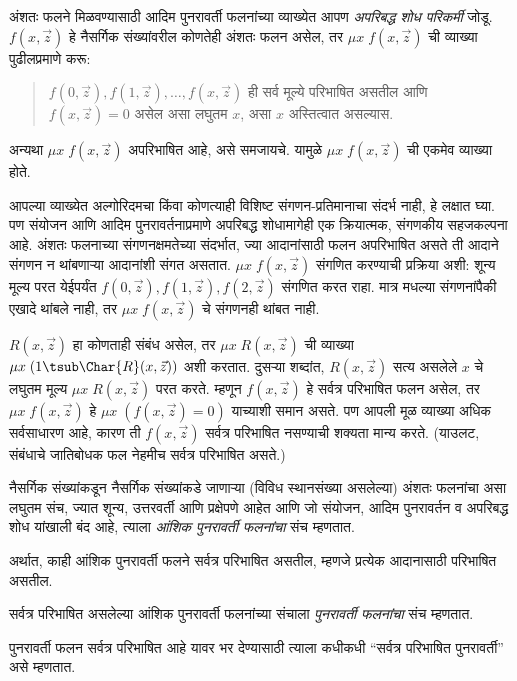 \documentclass[../../../include/open-logic-section]{subfiles}
\begin{document}
अंशतः फलने मिळवण्यासाठी आदिम पुनरावर्ती फलनांच्या व्याख्येत आपण
\emph{अपरिबद्ध शोध परिकर्मी} जोडू. $f(x,\vec z)$ हे नैसर्गिक संख्यांवरील
कोणतेही अंशतः फलन असेल, तर $\mu x \; f(x,\vec z)$ ची व्याख्या पुढीलप्रमाणे
करू:
\begin{quote}
  $f(0,\vec z), f(1,\vec z), \dots, f(x,\vec
  z)$ ही सर्व मूल्ये परिभाषित असतील आणि $f(x,\vec z) = 0$ असेल असा लघुतम
  $x$, असा $x$ अस्तित्वात असल्यास.
\end{quote}
अन्यथा $\mu x \; f(x,\vec z)$ अपरिभाषित आहे, असे समजायचे. यामुळे
$\mu x \; f(x,\vec z)$ ची एकमेव व्याख्या होते.

\begin{explain}
आपल्या व्याख्येत अल्गोरिदमचा
किंवा कोणत्याही विशिष्ट संगणन-प्रतिमानाचा संदर्भ नाही, हे लक्षात घ्या. पण
संयोजन आणि आदिम पुनरावर्तनाप्रमाणे अपरिबद्ध शोधामागेही एक क्रियात्मक,
संगणकीय सहजकल्पना आहे. अंशतः फलनाच्या संगणनक्षमतेच्या संदर्भात, ज्या
आदानांसाठी फलन अपरिभाषित असते ती आदाने संगणन न थांबणाऱ्या आदानांशी संगत
असतात. $\mu x \; f(x,\vec z)$ संगणित करण्याची प्रक्रिया अशी: शून्य मूल्य
परत येईपर्यंत $f(0,\vec z), f(1,\vec z), f(2,\vec z)$ संगणित करत राहा.
मात्र मधल्या संगणनांपैकी एखादे थांबले नाही, तर $\mu x \; f(x,\vec z)$ चे
संगणनही थांबत नाही.
\end{explain}

$R(x,\vec z)$ हा कोणताही संबंध असेल, तर $\mu x \; R(x,\vec z)$ ची व्याख्या
$\mu x \; (1 \tsub \Char{R}(x,\vec z))$ अशी करतात. दुसऱ्या शब्दांत,
$R(x,\vec z)$ सत्य असलेले $x$ चे लघुतम मूल्य $\mu x \; R(x,\vec z)$ परत
करते. म्हणून $f(x,\vec z)$ हे सर्वत्र परिभाषित फलन असेल, तर
$\mu x \; f(x,\vec z)$ हे $\mu x \; (f(x,\vec z) = 0)$ याच्याशी समान असते.
पण आपली मूळ व्याख्या अधिक सर्वसाधारण आहे, कारण ती $f(x,\vec z)$ सर्वत्र
परिभाषित नसण्याची शक्यता मान्य करते. (याउलट, संबंधाचे जातिबोधक फल नेहमीच
सर्वत्र परिभाषित असते.)

\begin{defn}
नैसर्गिक संख्यांकडून नैसर्गिक संख्यांकडे जाणाऱ्या (विविध स्थानसंख्या असलेल्या)
अंशतः फलनांचा असा लघुतम संच, ज्यात शून्य, उत्तरवर्ती आणि प्रक्षेपणे आहेत आणि
जो संयोजन, आदिम पुनरावर्तन व अपरिबद्ध शोध यांखाली बंद आहे, त्याला
\emph{आंशिक पुनरावर्ती फलनांचा} संच म्हणतात.
\end{defn}

अर्थात, काही आंशिक पुनरावर्ती फलने सर्वत्र परिभाषित असतील, म्हणजे प्रत्येक
आदानासाठी परिभाषित असतील.

\begin{defn}
सर्वत्र परिभाषित असलेल्या आंशिक पुनरावर्ती फलनांच्या संचाला
\emph{पुनरावर्ती फलनांचा} संच म्हणतात.
\end{defn}

पुनरावर्ती फलन सर्वत्र परिभाषित आहे यावर भर देण्यासाठी त्याला कधीकधी
``सर्वत्र परिभाषित पुनरावर्ती'' असे म्हणतात.
\end{document}
